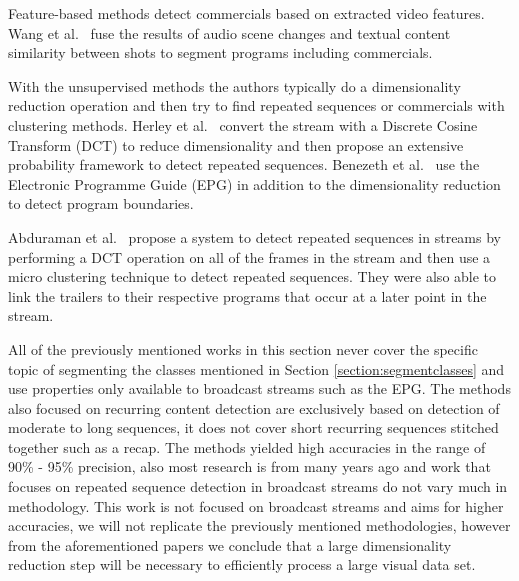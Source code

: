 \documentclass{article}
\begin{document}

Feature-based methods detect commercials based on extracted video features. Wang et al.\ \cite{wang2008multimodal} fuse the results of audio scene changes and textual content similarity between shots to segment programs including commercials.

With the unsupervised methods the authors typically do a dimensionality reduction operation and then try to find repeated sequences or commercials with clustering methods. Herley et al.\ \cite{herley2006argos} convert the stream with a Discrete Cosine Transform (DCT) to reduce dimensionality and then propose an extensive probability framework to detect repeated sequences. Benezeth et al.\ \cite{benezeth2010unsupervised} use the Electronic Programme Guide (EPG) in addition to the dimensionality reduction to detect program boundaries.

Abduraman et al.\ \cite{abduraman2011unsupervised} propose a system to detect repeated sequences in streams by performing a DCT operation on all of the frames in the stream and then use a micro clustering technique to detect repeated sequences. They were also able to link the trailers to their respective programs that occur at a later point in the stream.

All of the previously mentioned works in this section never cover the specific topic of segmenting the classes mentioned in Section \ref{section:segmentclasses} and use properties only available to broadcast streams such as the EPG. The methods also focused on recurring content detection are exclusively based on detection of moderate to long sequences, it does not cover short recurring sequences stitched together such as a recap. The methods yielded high accuracies in the range of 90\% - 95\% precision, also most research is from many years ago and work that focuses on repeated sequence detection in broadcast streams do not vary much in methodology. This work is not focused on broadcast streams and aims for higher accuracies, we will not replicate the previously mentioned methodologies, however from the aforementioned papers we conclude that a large dimensionality reduction step will be necessary to efficiently process a large visual data set.
\\
\end{document}
